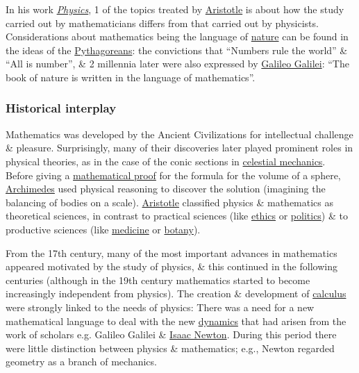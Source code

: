 \documentclass{article}
\begin{document}
In his work \href{https://en.wikipedia.org/wiki/Physics_(Aristotle)}{\it Physics}, 1 of the topics treated by \href{https://en.wikipedia.org/wiki/Aristotle}{\sc Aristotle} is about how the study carried out by mathematicians differs from that carried out by physicists. Considerations about mathematics being the language of \href{https://en.wikipedia.org/wiki/Nature}{nature} can be found in the ideas of the \href{https://en.wikipedia.org/wiki/Pythagoreans}{Pythagoreans}: the convictions that ``Numbers rule the world'' \& ``All is number'', \& 2 millennia later were also expressed by \href{https://en.wikipedia.org/wiki/Galileo_Galilei}{\sc Galileo Galilei}: ``The book of nature is written in the language of mathematics''.

\subsubsection{Historical interplay}
{\sf Mathematics was developed by the Ancient Civilizations for intellectual challenge \& pleasure. Surprisingly, many of their discoveries later played prominent roles in physical theories, as in the case of the conic sections in \href{https://en.wikipedia.org/wiki/Celestial_mechanics}{celestial mechanics}.} Before giving a \href{https://en.wikipedia.org/wiki/Mathematical_proof}{mathematical proof} for the formula for the volume of a sphere, \href{https://en.wikipedia.org/wiki/Archimedes}{\sc Archimedes} used physical reasoning to discover the solution (imagining the balancing of bodies on a scale). \href{https://en.wikipedia.org/wiki/Aristotle}{\sc Aristotle} classified physics \& mathematics as theoretical sciences, in contrast to practical sciences (like \href{https://en.wikipedia.org/wiki/Ethics}{ethics} or \href{https://en.wikipedia.org/wiki/Politics}{politics}) \& to productive sciences (like \href{https://en.wikipedia.org/wiki/Medicine}{medicine} or \href{https://en.wikipedia.org/wiki/Botany}{botany}).

From the 17th century, many of the most important advances in mathematics appeared motivated by the study of physics, \& this continued in the following centuries (although in the 19th century mathematics started to become increasingly independent from physics). The creation \& development of \href{https://en.wikipedia.org/wiki/Calculus}{calculus} were strongly linked to the needs of physics: There was a need for a new mathematical language to deal with the new \href{https://en.wikipedia.org/wiki/Dynamics_(mechanics)}{dynamics} that had arisen from the work of scholars e.g. {\sc Galileo Galilei} \& \href{https://en.wikipedia.org/wiki/Isaac_Newton}{\sc Isaac Newton}. During this period there were little distinction between physics \& mathematics; e.g., {\sc Newton} regarded geometry as a branch of mechanics.
\end{document}
